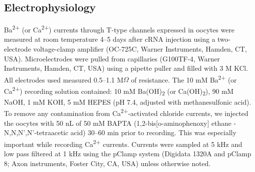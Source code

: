 \subsection*{Electrophysiology}

Ba\textsuperscript{2+} (or Ca\textsuperscript{2+}) currents through T-type channels expressed in oocytes were measured at room temperature 4--5 days after cRNA injection using a two-electrode voltage-clamp amplifier (OC-725C, Warner Instruments, Hamden, CT, USA).
Microelectrodes were pulled from capillaries (G100TF-4, Warner Instruments, Hamden, CT, USA) using a pipette puller and filled with 3 M KCl.
All electrodes used measured 0.5--1.1 M$\Omega$ of resistance.
The 10 mM Ba\textsuperscript{2+} (or Ca\textsuperscript{2+}) recording solution contained: 10 mM Ba(OH)\textsubscript{2} (or Ca(OH)\textsubscript{2}), 90 mM NaOH, 1 mM KOH, 5 mM HEPES (pH 7.4, adjusted with methanesulfonic acid).
To remove any contamination from Ca\textsuperscript{2+}-activated chloride currents, we injected the oocytes with 50 nL of 50 mM BAPTA (1,2-bis$[$o-aminophenoxy$]$ ethane -N,N,N\textquoteright,N\textquoteright-tetraacetic acid) 30--60 min prior to recording.
This was especially important while recording Ca\textsuperscript{2+} currents.
Currents were sampled at 5 kHz and low pass filtered at 1 kHz using the pClamp system (Digidata 1320A and pClamp 8; Axon instruments, Foster City, CA, USA) unless otherwise noted. 

